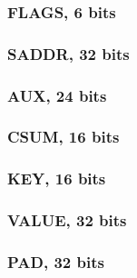\documentclass[a4paper, 11pt]{article}
\begin{document}
\paragraph{}

\subsubsection{FLAGS, 6 bits}
\paragraph{}

\subsubsection{SADDR, 32 bits}
\paragraph{}

\subsubsection{AUX, 24 bits}
\paragraph{}

\subsubsection{CSUM, 16 bits}
\paragraph{}

\subsubsection{KEY, 16 bits}
\paragraph{}

\subsubsection{VALUE, 32 bits}
\paragraph{}


\subsubsection{PAD, 32 bits}
\paragraph{}
\end{document}
